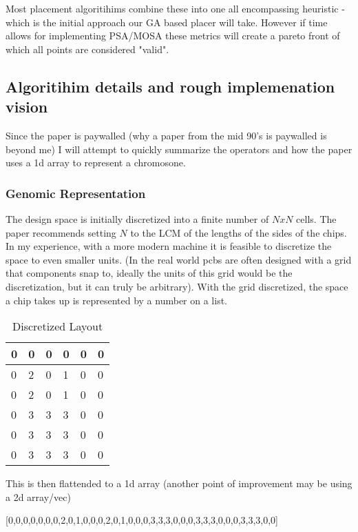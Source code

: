 \documentclass{article}
\begin{document}
Most placement algoritihims combine these into one all encompassing heuristic - which is the initial approach our GA based placer will take. However if time allows for implementing PSA/MOSA these metrics will create a pareto front of which all points are considered "valid". 

\subsection{Algoritihim details and rough implemenation vision}
Since the paper is paywalled (why a paper from the mid 90's is paywalled is beyond me) I will attempt to quickly summarize the operators and how the paper uses a 1d array to represent a chromosone. 

\subsubsection{Genomic Representation}
The design space is initially discretized into a finite number of $ N x N $ cells. The paper recommends setting $N$ to the LCM of the lengths of the sides of the chips. In my experience, with a more modern machine it is feasible to discretize the space to even smaller units. (In the real world pcbs are often designed with a grid that components snap to, ideally the units of this grid would be the discretization, but it can truly be arbitrary). With the grid discretized, the space a chip takes up is represented by a number on a list. 

\begin{table}[ht]
    \centering
\begin{tabular}{|l|l|l|l|l|l|}
\hline
0 & 0 & 0 & 0 & 0 & 0 \\ \hline
0 & 2 & 0 & 1 & 0 & 0 \\ \hline
0 & 2 & 0 & 1 & 0 & 0 \\ \hline
0 & 3 & 3 & 3 & 0 & 0 \\ \hline
0 & 3 & 3 & 3 & 0 & 0 \\ \hline
0 & 3 & 3 & 3 & 0 & 0 \\ \hline
\end{tabular}

\caption{Discretized Layout}
\end{table}

This is then flattended to a 1d array (another point of improvement may be using a 2d array/vec)

[0,0,0,0,0,0,0,2,0,1,0,0,0,2,0,1,0,0,0,3,3,3,0,0,0,3,3,3,0,0,0,3,3,3,0,0]
\end{document}
